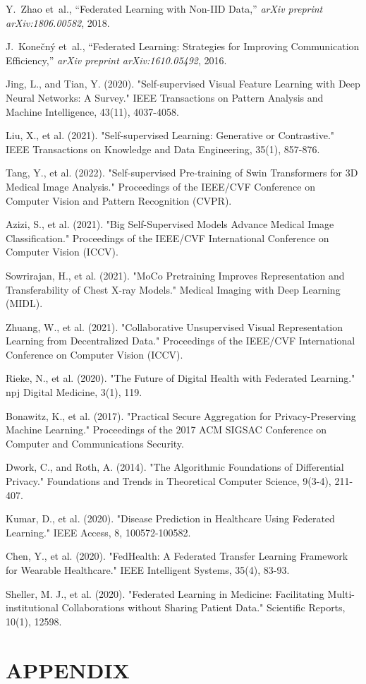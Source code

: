 \documentclass[a4paper, 10 pt, conference]{ieeeconf}
\begin{document}
\begin{thebibliography}{99}
Y.~Zhao et~al., ``Federated Learning with Non-IID Data,'' \emph{arXiv preprint arXiv:1806.00582}, 2018.

J.~Konečný et~al., ``Federated Learning: Strategies for Improving Communication Efficiency,'' \emph{arXiv preprint arXiv:1610.05492}, 2016.

Jing, L., and Tian, Y. (2020). "Self-supervised Visual Feature Learning with Deep Neural Networks: A Survey." IEEE Transactions on Pattern Analysis and Machine Intelligence, 43(11), 4037-4058.

Liu, X., et al. (2021). "Self-supervised Learning: Generative or Contrastive." IEEE Transactions on Knowledge and Data Engineering, 35(1), 857-876.

Tang, Y., et al. (2022). "Self-supervised Pre-training of Swin Transformers for 3D Medical Image Analysis." Proceedings of the IEEE/CVF Conference on Computer Vision and Pattern Recognition (CVPR).

Azizi, S., et al. (2021). "Big Self-Supervised Models Advance Medical Image Classification." Proceedings of the IEEE/CVF International Conference on Computer Vision (ICCV).

Sowrirajan, H., et al. (2021). "MoCo Pretraining Improves Representation and Transferability of Chest X-ray Models." Medical Imaging with Deep Learning (MIDL).

Zhuang, W., et al. (2021). "Collaborative Unsupervised Visual Representation Learning from Decentralized Data." Proceedings of the IEEE/CVF International Conference on Computer Vision (ICCV).

Rieke, N., et al. (2020). "The Future of Digital Health with Federated Learning." npj Digital Medicine, 3(1), 119.

Bonawitz, K., et al. (2017). "Practical Secure Aggregation for Privacy-Preserving Machine Learning." Proceedings of the 2017 ACM SIGSAC Conference on Computer and Communications Security.

Dwork, C., and Roth, A. (2014). "The Algorithmic Foundations of Differential Privacy." Foundations and Trends in Theoretical Computer Science, 9(3-4), 211-407.

Kumar, D., et al. (2020). "Disease Prediction in Healthcare Using Federated Learning." IEEE Access, 8, 100572-100582.

Chen, Y., et al. (2020). "FedHealth: A Federated Transfer Learning Framework for Wearable Healthcare." IEEE Intelligent Systems, 35(4), 83-93.

Sheller, M. J., et al. (2020). "Federated Learning in Medicine: Facilitating Multi-institutional Collaborations without Sharing Patient Data." Scientific Reports, 10(1), 12598.

\end{thebibliography}

\newpage
\onecolumn
\section*{\Huge APPENDIX}
\end{document}
